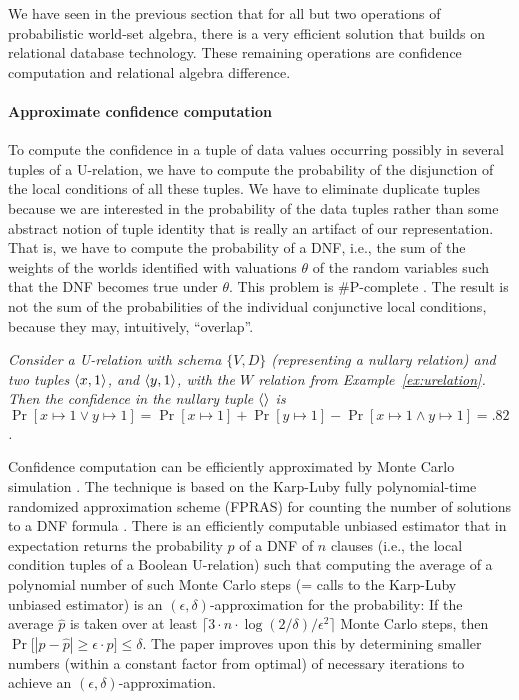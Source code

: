 We have seen in the previous section that for all but two operations of
probabilistic world-set algebra, there is a very efficient
solution that builds on relational database technology.
These remaining operations are confidence computation and relational
algebra difference.


\paragraph{Approximate confidence computation}
%
To compute the confidence in a tuple of data values occurring possibly in several tuples
of a U-relation, we have to compute the probability of the disjunction of the local conditions of all these tuples. We have to eliminate duplicate tuples because we are interested in the  probability of the data tuples rather than some abstract notion of tuple identity that is really an artifact of our representation. That is, we have to compute the probability of a
DNF, i.e., the sum of the weights of the worlds identified with valuations $\theta$ of the random variables such that the DNF becomes true under $\theta$. This problem is \#P-complete
\cite{GGH1998,dalvi07efficient}. The result is not the sum of the probabilities of the individual conjunctive local conditions, because they may, intuitively, ``overlap''.

\begin{example}\em
Consider
a U-relation with schema $\{V,D\}$ (representing a nullary relation) and two tuples
$\langle x,1 \rangle$, and $\langle y,1 \rangle$, with the $W$ relation from Example~\ref{ex:urelation}.
Then the confidence in the nullary tuple $\langle  \rangle$ is $\Pr[x \mapsto 1 \lor y \mapsto 1] =
\Pr[x \mapsto 1] + \Pr[y \mapsto 1] - \Pr[x \mapsto 1 \land y \mapsto 1] = .82$.
\punto
\end{example}


Confidence computation can be efficiently approximated by Monte Carlo simulation \cite{GGH1998,dalvi07efficient,Koch2008}.
The technique is based on the Karp-Luby fully poly\-no\-mi\-al-time randomized approximation scheme (FPRAS) for counting the number of solutions to a DNF formula \cite{KL1983,KLM1989,DKLR2000}.
%
There is an efficiently computable unbiased estimator that in expectation returns the probability $p$ of a DNF of $n$ clauses (i.e., the local condition tuples of a Boolean U-relation) such that computing the average of a polynomial number of such Monte Carlo steps (= calls to the Karp-Luby unbiased estimator) is an $(\epsilon, \delta)$-approximation for the probability: If the average $\hat{p}$ is taken over at least $\lceil 3 \cdot n \cdot \log(2/\delta)/\epsilon^2 \rceil$ Monte Carlo steps, then $\Pr\big[ |p - \hat{p}| \ge \epsilon \cdot p \big] \le \delta$. The paper \cite{DKLR2000} improves upon this  by determining smaller numbers (within a constant factor from optimal) of necessary iterations to achieve an $(\epsilon, \delta)$-approximation.



